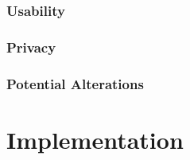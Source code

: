 \documentclass[12pt]{report}
\begin{document}
\subsection{Usability}
\subsection{Privacy}

\subsection{Potential Alterations}  %

\chapter{Implementation}
\end{document}
